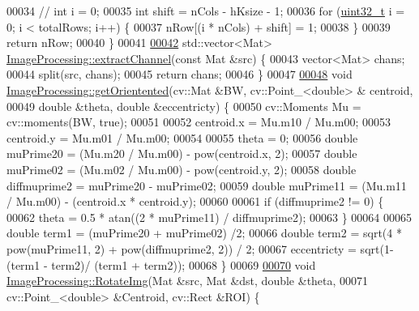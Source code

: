 \begin{DoxyCode}
00034   \textcolor{comment}{// int i = 0;}
00035   \textcolor{keywordtype}{int} shift = nCols - hKsize - 1;
00036   \textcolor{keywordflow}{for} (\hyperlink{_soil_math_types_8h_a435d1572bf3f880d55459d9805097f62}{uint32\_t} i = 0; i < totalRows; i++) \{
00037     nRow[(i * nCols) + shift] = 1;
00038   \}
00039   \textcolor{keywordflow}{return} nRow;
00040 \}
00041 
\hypertarget{_image_processing_8cpp_source_l00042}{}\hyperlink{class_vision_1_1_image_processing_ad5fa51caaabb8cb0fc2c15f645695a3c}{00042} std::vector<Mat> \hyperlink{class_vision_1_1_image_processing_ad5fa51caaabb8cb0fc2c15f645695a3c}{ImageProcessing::extractChannel}(\textcolor{keyword}{const} Mat &src) \{
00043   vector<Mat> chans;
00044   split(src, chans);
00045   \textcolor{keywordflow}{return} chans;
00046 \}
00047 
\hypertarget{_image_processing_8cpp_source_l00048}{}\hyperlink{class_vision_1_1_image_processing_a052aaae527703c3991310b9b1e704576}{00048} \textcolor{keywordtype}{void} \hyperlink{class_vision_1_1_image_processing_a052aaae527703c3991310b9b1e704576}{ImageProcessing::getOrientented}(cv::Mat &BW, cv::Point\_<double> &
      centroid,
00049                                      \textcolor{keywordtype}{double} &theta, \textcolor{keywordtype}{double} &eccentricty) \{
00050   cv::Moments Mu = cv::moments(BW, \textcolor{keyword}{true});
00051 
00052   centroid.x = Mu.m10 / Mu.m00;
00053   centroid.y = Mu.m01 / Mu.m00;
00054 
00055   theta = 0;
00056   \textcolor{keywordtype}{double} muPrime20 = (Mu.m20 / Mu.m00) - pow(centroid.x, 2);
00057   \textcolor{keywordtype}{double} muPrime02 = (Mu.m02 / Mu.m00) - pow(centroid.y, 2);
00058   \textcolor{keywordtype}{double} diffmuprime2 = muPrime20 - muPrime02;
00059   \textcolor{keywordtype}{double} muPrime11 = (Mu.m11 / Mu.m00) - (centroid.x * centroid.y);
00060 
00061   \textcolor{keywordflow}{if} (diffmuprime2 != 0) \{
00062     theta = 0.5 * atan((2 * muPrime11) / diffmuprime2);
00063   \}
00064 
00065   \textcolor{keywordtype}{double} term1 = (muPrime20 + muPrime02) /2;
00066   \textcolor{keywordtype}{double} term2 = sqrt(4 * pow(muPrime11, 2) + pow(diffmuprime2, 2)) / 2;
00067   eccentricty = sqrt(1-(term1 - term2)/ (term1 + term2));
00068 \}
00069 
\hypertarget{_image_processing_8cpp_source_l00070}{}\hyperlink{class_vision_1_1_image_processing_a2cbae1b5d9542edab2e59da8e3e23d2a}{00070} \textcolor{keywordtype}{void} \hyperlink{class_vision_1_1_image_processing_a2cbae1b5d9542edab2e59da8e3e23d2a}{ImageProcessing::RotateImg}(Mat &src, Mat &dst, \textcolor{keywordtype}{double} &theta,
00071                                 cv::Point\_<double> &Centroid, cv::Rect &ROI) \{

\end{DoxyCode}
